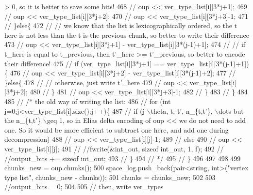 \begin{DoxyCode}
{       > 0, so it is better to save some bits!}
468   \textcolor{comment}{//       oup << ver\_type\_list[i][3*j+1];}
469   \textcolor{comment}{//       oup << ver\_type\_list[i][3*j+2];}
470   \textcolor{comment}{//       oup << ver\_type\_list[i][3*j+3]-1;}
471   \textcolor{comment}{//     \}else\{}
472   \textcolor{comment}{//       // we know that the list is lexicographically ordered, so the t here is not less than the t is
       the previous chunk, so better to write their difference}
473   \textcolor{comment}{//       oup << ver\_type\_list[i][3*j+1] - ver\_type\_list[i][3*(j-1)+1];}
474   \textcolor{comment}{//       // if t\_here is equal to t\_previous, then t'\_here >= t'\_previous, so better to encode their
       difference!}
475   \textcolor{comment}{//       if (ver\_type\_list[i][3*j+1] == ver\_type\_list[i][3*(j-1)+1])\{}
476   \textcolor{comment}{//         oup << ver\_type\_list[i][3*j+2] - ver\_type\_list[i][3*(j-1)+2];}
477   \textcolor{comment}{//       \}else\{}
478   \textcolor{comment}{//         // otherwise, just write t'\_here}
479   \textcolor{comment}{//         oup << ver\_type\_list[i][3*j+2];}
480   \textcolor{comment}{//       \}}
481   \textcolor{comment}{//       oup << ver\_type\_list[i][3*j+3]-1;}
482   \textcolor{comment}{//     \}}
483   \textcolor{comment}{//   \}}
484 
485   \textcolor{comment}{//   /* the old way of writing the list:}
486   \textcolor{comment}{//   for (int j=0;j<ver\_type\_list[i].size();j++)\{}
487   \textcolor{comment}{//     if (j%
       \(\backslash\)theta, t, t', n\_\{t,t'\}, \(\backslash\)dots but the n\_\{t,t'\} \(\backslash\)geq 1, so in Elias delta encoding of oup << we do not need to
       add one. So it would be more efficient to subtract one here, and add one during decompression)}
488   \textcolor{comment}{//       oup << ver\_type\_list[i][j]-1;}
489   \textcolor{comment}{//     else}
490   \textcolor{comment}{//       oup << ver\_type\_list[i][j];}
491   \textcolor{comment}{//     //fwrite(&int\_out, sizeof int\_out, 1, f);}
492   \textcolor{comment}{//     //output\_bits += sizeof int\_out;}
493   \textcolor{comment}{//   \}}
494   \textcolor{comment}{//   */}
495   \textcolor{comment}{// \}}
496 
497 
498 
499   chunks\_new = oup.chunks();
500   space\_log.push\_back(pair<string, int>(\textcolor{stringliteral}{"vertex type list"}, chunks\_new - chunks));
501   chunks = chunks\_new;
502 
503   \textcolor{comment}{//output\_bits = 0;}
504   
505   \textcolor{comment}{// then, write ver\_types}

\end{DoxyCode}
